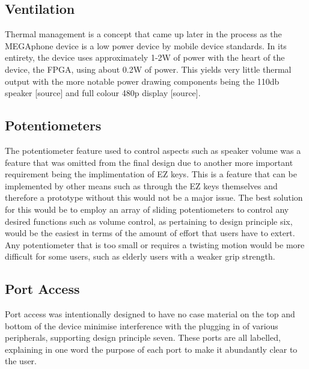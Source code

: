\subsection{Ventilation} %

Thermal management is a concept that came up later in the process as the MEGAphone device is a low power device by mobile device standards.
In its entirety, the device uses approximately 1-2W of power with the heart of the device, the FPGA, using about 0.2W of power.
This yields very little thermal output with the more notable power drawing components being the 110db speaker [source] and full colour 480p display [source].

\subsection{Potentiometers}

The potentiometer feature used to control aspects such as speaker volume was a feature that was omitted from the final design due to another more important requirement being the implimentation of EZ keys.
This is a feature that can be implemented by other means such as through the EZ keys themselves and therefore a prototype without this would not be a major issue.
The best solution for this would be to employ an array of sliding potentiometers to control any desired functions such as volume control, as pertaining to design principle six, would be the easiest in terms of the amount of effort that users have to extert.
Any potentiometer that is too small or requires a twisting motion would be more difficult for some users, such as elderly users with a weaker grip strength.

\subsection{Port Access}

Port access was intentionally designed to have no case material on the top and bottom of the device minimise interference with the plugging in of various peripherals, supporting design principle seven.
These ports are all labelled, explaining in one word the purpose of each port to make it abundantly clear to the user.

